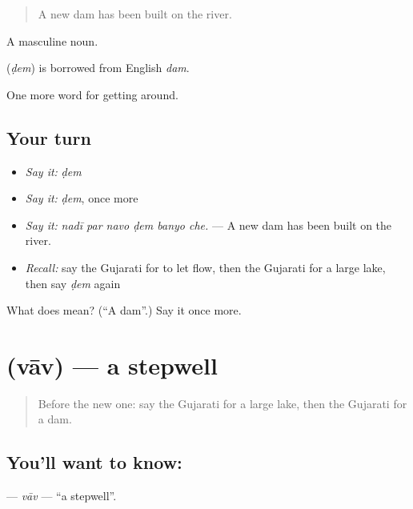 \begin{quote}
A new dam has been built on the river.
\end{quote}

A masculine noun.

\begin{cousinweb}
\textbf{} (\emph{ḍem}) is borrowed from English \emph{dam}.
\end{cousinweb}

\begin{grammarlens}[title={What you've built}]
One more word for getting around.
\end{grammarlens}

\subsection*{Your turn}
\begin{itemize}
\raggedright
  \item \emph{Say it:} \emph{ḍem}
  \item \emph{Say it:} \emph{ḍem}, once more
  \item \emph{Say it:} \emph{nadī par navo ḍem banyo che.} — A new dam has been built on the river.
  \item \emph{Recall:} say the Gujarati for to let flow, then the Gujarati for a large lake, then say \emph{ḍem} again
\end{itemize}

\begin{tcolorbox}[breakable,colback=teal!4,colframe=teal!35!black,title={Before you move on}]
What does  mean? (\textquotedblleft{}A dam\textquotedblright{}.) Say it once more.
\end{tcolorbox}
\section[\texorpdfstring{\gu{વાવ} (vāv)}{વાવ (vāv)}]{ (vāv) — a stepwell}

\label{lesson:GU-C441-vav}



\begin{quote}
Before the new one: say the Gujarati for a large lake, then the Gujarati for a dam.
\end{quote}

\subsection*{You'll want to know: }
\textbf{} — \emph{vāv} — \textquotedblleft{}a stepwell\textquotedblright{}.

